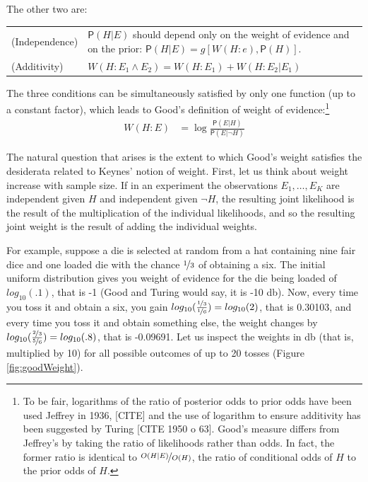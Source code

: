 \documentclass[
  10pt,
  dvipsnames,enabledeprecatedfontcommands]{scrartcl}
\newcommand{\pr}[1]{\mathsf{P}(#1)}
\begin{document}
The other two are:

\begin{tabular}{lp{11cm}}
(Independence) & $\pr{H\vert E} $ should depend only on the weight of evidence and on the prior: $\pr{H \vert E} = g[W(H:e), \pr{H}]$.\\
(Additivity)  & $W(H: E_1 \wedge E_2)  = W(H:E_1) + W(H:E_2 \vert E_1)$
\end{tabular}

\noindent The three conditions can be simultaneously satisfied by only
one function (up to a constant factor), which leads to Good's definition
of weight of evidence:\footnote{To be fair, logarithms of the ratio of
  posterior odds to prior odds have been used Jeffrey in 1936,
  {[}CITE{]} and the use of logarithm to ensure additivity has been
  suggested by Turing {[}CITE 1950 o 63{]}. Good's measure differs from
  Jeffrey's by taking the ratio of likelihoods rather than odds. In
  fact, the former ratio is identical to
  \(\nicefrac{O(H\vert E)}{O(H)}\), the ratio of conditional odds of
  \(H\) to the prior odds of \(H\).} \begin{align*}
W(H:E) & = \log \frac{\pr{E \vert H}}{\pr{E\vert \neg H}}
\end{align*}

The natural question that arises is the extent to which Good's weight
satisfies the desiderata related to Keynes' notion of weight. First, let
us think about weight increase with sample size. If in an experiment the
observations \(E_1, \dots, E_K\) are independent given \(H\) and
independent given \(\neg H\), the resulting joint likelihood is the
result of the multiplication of the individual likelihoods, and so the
resulting joint weight is the result of adding the individual weights.

For example, suppose a die is selected at random from a hat containing
nine fair dice and one loaded die with the chance \(\nicefrac{1}{3}\) of
obtaining a six. The initial uniform distribution gives you weight of
evidence for the die being loaded of \(log_{10}(.1)\), that is -1 (Good
and Turing would say, it is -10 db). Now, every time you toss it and
obtain a six, you gain
\(log_{10}(\frac{\nicefrac{1}{3}}{\nicefrac{1}{6}})= log_{10}(2)\), that
is 0.30103, and every time you toss it and obtain something else, the
weight changes by
\(log_{10}(\frac{\nicefrac{2}{3}}{\nicefrac{5}{6}})= log_{10}(.8)\),
that is -0.09691. Let us inspect the weights in db (that is, multiplied
by 10) for all possible outcomes of up to 20 tosses (Figure
\ref{fig:goodWeight}).
\end{document}
